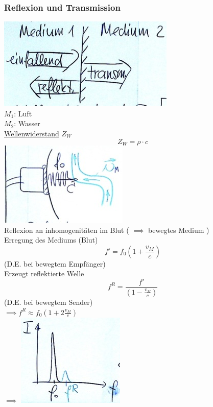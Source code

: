 \subsubsection{Reflexion und Transmission}
\includegraphics{Bild239} \\
$M_1$: Luft \\
$M_2$: Wasser \\
\uline{Wellenwiderstand} $Z_W$
\[ \boxed{ Z_W = \rho \cdot c } \]
\includegraphics{Bild240} \\
Reflexion an inhomogenitäten im Blut ( $\implies$ bewegtes Medium ) \\
Erregung des Mediums (Blut)
\[ f' = f_0 \left( 1 + \frac{v_M}{c} \right) \]
(D.E. bei bewegtem Empfänger) \\
Erzeugt reflektierte Welle
\[ f^R = \frac{f'}{\left( 1 - \frac{v_M}{c} \right) } \]
(D.E. bei bewegtem Sender) \\
$\implies f^R \approx f_0 \left( 1 + 2 \frac{v_M}{c} \right)$ \\
$\implies$ \includegraphics{Bild241}
